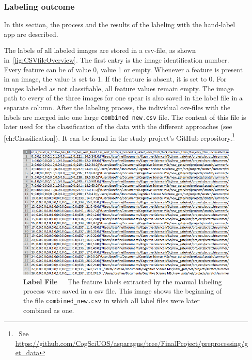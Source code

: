 \subsubsection{Labeling outcome}
\label{subsec:SortingOutcome}

In this section, the process and the results of the labeling with the hand-label app are described.

The labels of all labeled images are stored in a csv-file, as shown in~\autoref{fig:CSVfileOverview}. The first entry is the image identification number. Every feature can be of value 0, value 1 or empty. Whenever a feature is present in an image, the value is set to 1. If the feature is absent, it is set to 0. For images labeled as not classifiable, all feature values remain empty. The image path to every of the three images for one spear is also saved in the label file in a separate column. After the labeling process, the individual csv-files with the labels are merged into one large \texttt{combined\_new.csv} file. The content of this file is later used for the classification of the data with the different approaches (see \autoref{ch:Classification}). It can be found in the study project’s GitHub repository.\footnote{~See \url{https://github.com/CogSciUOS/asparagus/tree/FinalProject/preprocessing/get_data}}

\begin{figure}[!ht]
	\centering
	\includegraphics[scale=0.5]{Figures/chapter03/csv_overview.png}
	\decoRule
	\caption[Manual Labeling Output CSV-File]{\textbf{Label File}~~~The feature labels extracted by the manual labeling process were saved in a csv file. This image shows the beginning of the file \texttt{combined\_new.csv} in which all label files were later combined as one.}
	\label{fig:CSVfileOverview}
\end{figure}

